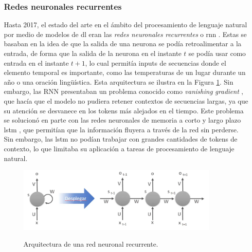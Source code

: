 \subsubsection{Redes neuronales recurrentes}
Hasta 2017, el estado del arte en el ámbito del procesamiento de lenguaje natural por medio de modelos de \gls{dl} eran las \emph{redes neuronales recurrentes} o \gls{rnn} \citep{schmidtRecurrentNeuralNetworks2019}. Estas se basaban en la idea de que la salida de una neurona se podía retroalimentar a la entrada, de forma que la salida de la neurona en el instante $t$ se podía usar como entrada en el instante $t+1$, lo cual permitía inputs de secuencias donde el elemento temporal es importante, como las temperaturas de un lugar durante un año o una oración lingüística. Esta arquitectura se ilustra en la Figura \ref{fig:red_neuronal_recurrente}. Sin embargo, las RNN presentaban un problema conocido como \emph{vanishing gradient} \citep{pascanuDifficultyTrainingRecurrent2013}, que hacía que el modelo no pudiera retener contextos de secuencias largas, ya que su atención se desvanece en los tokens más alejados en el tiempo. Este problema se solucionó en parte con las redes neuronales de memoria a corto y largo plazo \gls{lstm} \citep{HochreiterVanishingGradient1998}, que permitían que la información fluyera a través de la red sin perderse. Sin embargo, las \gls{lstm} no podían trabajar con grandes cantidades de tokens de contexto, lo que limitaba su aplicación a tareas de procesamiento de lenguaje natural.

\begin{figure}[H]
    \caption[Arquitectura de una red neuronal recurrente]{Arquitectura de una red neuronal recurrente.}
    \centering
    \includegraphics[width=0.9\textwidth]{./figuras/red_neuronal_recurrente.png}
    \label{fig:red_neuronal_recurrente}
\end{figure}


